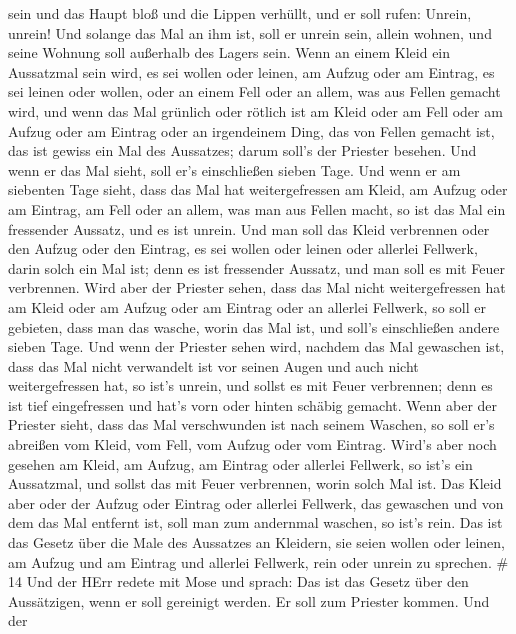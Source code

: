 sein und das Haupt bloß und die Lippen verhüllt, und er soll rufen:
Unrein, unrein!  Und solange das Mal an ihm ist, soll er
unrein sein, allein wohnen, und seine Wohnung soll außerhalb des Lagers
sein.  Wenn an einem Kleid ein Aussatzmal sein wird, es sei
wollen oder leinen,  am Aufzug oder am Eintrag, es sei
leinen oder wollen, oder an einem Fell oder an allem, was aus Fellen
gemacht wird,  und wenn das Mal grünlich oder rötlich ist
am Kleid oder am Fell oder am Aufzug oder am Eintrag oder an irgendeinem
Ding, das von Fellen gemacht ist, das ist gewiss ein Mal des Aussatzes;
darum soll's der Priester besehen.  Und wenn er das Mal
sieht, soll er's einschließen sieben Tage.  Und wenn er am
siebenten Tage sieht, dass das Mal hat weitergefressen am Kleid, am
Aufzug oder am Eintrag, am Fell oder an allem, was man aus Fellen macht,
so ist das Mal ein fressender Aussatz, und es ist unrein. 
Und man soll das Kleid verbrennen oder den Aufzug oder den Eintrag, es
sei wollen oder leinen oder allerlei Fellwerk, darin solch ein Mal ist;
denn es ist fressender Aussatz, und man soll es mit Feuer verbrennen.
 Wird aber der Priester sehen, dass das Mal nicht
weitergefressen hat am Kleid oder am Aufzug oder am Eintrag oder an
allerlei Fellwerk,  so soll er gebieten, dass man das
wasche, worin das Mal ist, und soll's einschließen andere sieben Tage.
 Und wenn der Priester sehen wird, nachdem das Mal
gewaschen ist, dass das Mal nicht verwandelt ist vor seinen Augen und
auch nicht weitergefressen hat, so ist's unrein, und sollst es mit Feuer
verbrennen; denn es ist tief eingefressen und hat's vorn oder hinten
schäbig gemacht.  Wenn aber der Priester sieht, dass das
Mal verschwunden ist nach seinem Waschen, so soll er's abreißen vom
Kleid, vom Fell, vom Aufzug oder vom Eintrag.  Wird's aber
noch gesehen am Kleid, am Aufzug, am Eintrag oder allerlei Fellwerk, so
ist's ein Aussatzmal, und sollst das mit Feuer verbrennen, worin solch
Mal ist.  Das Kleid aber oder der Aufzug oder Eintrag oder
allerlei Fellwerk, das gewaschen und von dem das Mal entfernt ist, soll
man zum andernmal waschen, so ist's rein.  Das ist das
Gesetz über die Male des Aussatzes an Kleidern, sie seien wollen oder
leinen, am Aufzug und am Eintrag und allerlei Fellwerk, rein oder unrein
zu sprechen. \# 14  Und der HErr redete mit Mose und sprach:
 Das ist das Gesetz über den Aussätzigen, wenn er soll
gereinigt werden. Er soll zum Priester kommen.  Und der
